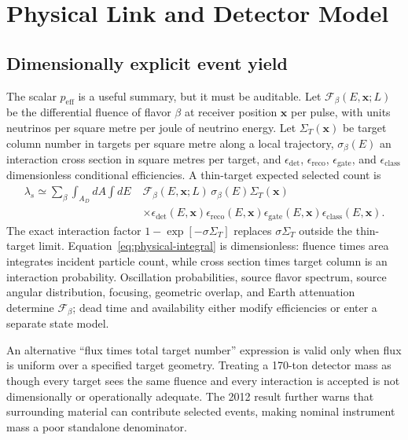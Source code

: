 \documentclass[11pt]{article}
\newcommand{\vect}[1]{\boldsymbol{#1}}
\begin{document}
\section{Physical Link and Detector Model}

\subsection{Dimensionally explicit event yield}

The scalar $p_{\mathrm{eff}}$ is a useful summary, but it must be auditable. Let $\mathcal{F}_\beta(E,\vect{x};L)$ be the differential fluence of flavor $\beta$ at receiver position $\vect{x}$ per pulse, with units neutrinos per square metre per joule of neutrino energy. Let $\Sigma_T(\vect{x})$ be target column number in targets per square metre along a local trajectory, $\sigma_{\beta}(E)$ an interaction cross section in square metres per target, and $\epsilon_{\mathrm{det}}$, $\epsilon_{\mathrm{reco}}$, $\epsilon_{\mathrm{gate}}$, and $\epsilon_{\mathrm{class}}$ dimensionless conditional efficiencies. A thin-target expected selected count is
\begin{align}
\lambda_s \simeq \sum_\beta \int_{A_D}\!dA\int\!dE\;
&\mathcal{F}_\beta(E,\vect{x};L)\,
\sigma_\beta(E)\Sigma_T(\vect{x})\nonumber\\
&\times\epsilon_{\mathrm{det}}(E,\vect{x})
\epsilon_{\mathrm{reco}}(E,\vect{x})
\epsilon_{\mathrm{gate}}(E,\vect{x})
\epsilon_{\mathrm{class}}(E,\vect{x}).
\label{eq:physical-integral}
\end{align}
The exact interaction factor $1-\exp[-\sigma\Sigma_T]$ replaces $\sigma\Sigma_T$ outside the thin-target limit. Equation~\eqref{eq:physical-integral} is dimensionless: fluence times area integrates incident particle count, while cross section times target column is an interaction probability. Oscillation probabilities, source flavor spectrum, source angular distribution, focusing, geometric overlap, and Earth attenuation determine $\mathcal{F}_\beta$; dead time and availability either modify efficiencies or enter a separate state model.

An alternative ``flux times total target number'' expression is valid only when flux is uniform over a specified target geometry. Treating a 170-ton detector mass as though every target sees the same fluence and every interaction is accepted is not dimensionally or operationally adequate. The 2012 result further warns that surrounding material can contribute selected events, making nominal instrument mass a poor standalone denominator.
\end{document}
